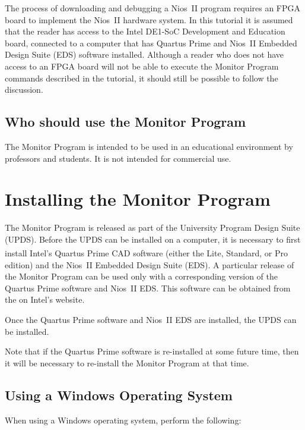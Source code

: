 \documentclass[11pt, twoside, pdftex]{article}
\begin{document}
The process of downloading and debugging a Nios~II program
requires an FPGA board to implement the Nios~II hardware system.
In this tutorial it is assumed that the reader has access to the
Intel DE1-SoC Development and Education board, connected to a
computer that has Quartus Prime 
and Nios~II Embedded Design Suite (EDS) software installed. Although a reader who does not have access to an FPGA board will
not be able to execute the Monitor Program commands described in
the tutorial, it should still be possible to follow the
discussion.


\subsection{Who should use the Monitor Program}

The Monitor Program is intended to be used in an educational
environment by professors and students. It is not intended for
commercial use.

\section{Installing the Monitor Program}

The Monitor Program is released as part of the University
Program Design Suite (UPDS). Before the UPDS can be installed on
a computer, it is necessary to first install Intel's Quartus\textsuperscript{\textregistered} Prime
CAD software (either the Lite, Standard, or Pro edition) 
and the Nios~II Embedded Design Suite (EDS). A particular release
of the Monitor Program can be used only with a corresponding version of the Quartus Prime software and Nios~II EDS. This software
can be obtained from the on Intel's website.

Once the Quartus Prime software and Nios~II EDS are installed, the UPDS can be installed.

Note that if the Quartus Prime software is re-installed at some
future time, then it will be necessary to re-install the Monitor
Program at that time.

\subsection{Using a Windows Operating System}

When using a Windows operating system, perform the following: 
\end{document}
